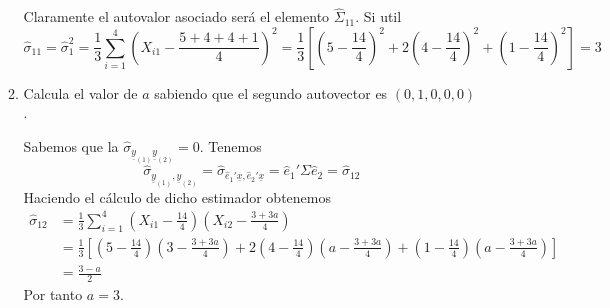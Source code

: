 \documentclass[twoside]{article}
\newcommand{\muestra}[1]{{\underline{#1}}}
\begin{document}
\begin{enumerate}
\begin{enumerate}
	Claramente el autovalor asociado será el elemento $\hat{\Sigma}_{11}$. Si util
$$
\hat{\sigma}_{11}=\hat{\sigma}_1^2=\frac{1}{3}\sum_{i=1}^4(X_{i1}-\frac{5+4+4+1}{4})^2 = \frac{1}{3}\left[(5-\frac{14}{4})^2 +  2(4-\frac{14}{4})^2 + (1-\frac{14}{4})^2\right]= 3
$$

	\item Calcula el valor de $a$ sabiendo que el segundo autovector es $(0,1,0,0,0)$. 
	
Sabemos que la $\hat{\sigma}_{\muestra{y}_{(1)}\muestra{y}_{(2)}}=0$. Tenemos
$$
\hat{\sigma}_{\muestra{y}_{(1)},\muestra{y}_{(2)}} = \hat{\sigma}_{\hat{e}_1'\muestra{x},\hat{e}_2'\muestra{x}} = \hat{e}_1'\Sigma \hat{e}_2 = \hat{\sigma}_{12}
$$
Haciendo el cálculo de dicho estimador obtenemos
\begin{align*}
\hat{\sigma}_{12}&=\frac{1}{3}\sum_{i=1}^4(X_{i1}-\frac{14}{4})(X_{i2}-\frac{3+3a}{4})\\
&=\frac{1}{3}\left[(5-\frac{14}{4})(3-\frac{3+3a}{4})+2(4-\frac{14}{4})(a-\frac{3+3a}{4})+(1-\frac{14}{4})(a-\frac{3+3a}{4})\right]\\
&=\frac{3-a}{2}
\end{align*}
Por tanto $a=3$.

\end{enumerate}
\end{enumerate}
\end{document}
